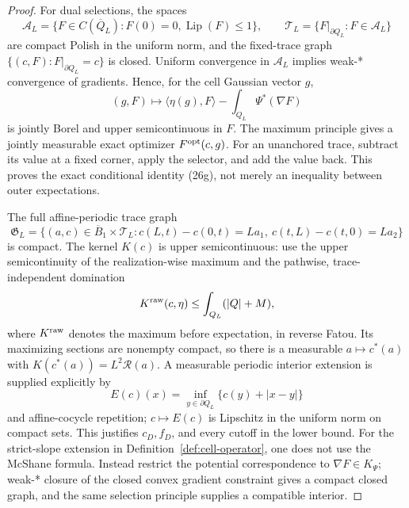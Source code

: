 \documentclass{smfart}
\theoremstyle{definition}
\newcommand{\1}{\mathbf 1}
\begin{document}
\begin{proof}
For dual selections, the spaces
\begin{equation*}
\mathscr A_ L=\{F\in C(\overline Q_ L):F(0)=0,
\operatorname {Lip}(F)\leq1\},
\qquad \mathcal T_ L=\{F|_ {\partial Q_ L}:F\in\mathscr A_ L\}
\end{equation*}
are compact Polish in the uniform norm, and the fixed-trace graph
$\{(c,F):F|_ {\partial Q_ L}=c\}$ is closed.  Uniform convergence in
$\mathscr A_ L$ implies weak-* convergence of gradients.  Hence, for
the cell Gaussian vector $g$,
\begin{equation}
(g,F)\longmapsto\langle\eta(g),F\rangle
-\int_ {Q_ L}\Psi^*(\nabla F)
\tag{26q}
\end{equation}
is jointly Borel and upper semicontinuous in $F$.  The maximum
principle gives a jointly measurable exact optimizer
$F^{\rm opt}(c,g)$.  For an unanchored trace, subtract its value at a
fixed corner, apply the selector, and add the value back.  This proves
the exact conditional identity (26g), not merely an inequality between
outer expectations.

The full affine-periodic trace graph
\begin{equation}
\mathfrak G_ L=\{(a,c)\in\overline B_ 1\times\mathcal T_ L:
c(L,t)-c(0,t)=La_ 1,\ c(t,L)-c(t,0)=La_ 2\}
\tag{26r}
\end{equation}
is compact.  The kernel $K(c)$ is upper semicontinuous: use the
upper semicontinuity of the realization-wise maximum and the pathwise,
trace-independent domination
\begin{equation*}
K^{\rm raw}(c,\eta)\leq\int_ {Q_ L}(|Q|+M),
\end{equation*}
where
$K^{\rm raw}$ denotes the maximum before expectation, in reverse
Fatou.  Its maximizing sections are
nonempty compact, so there is a measurable
$a\mapsto c^*(a)$ with $K(c^*(a))=L^2\mathcal R(a)$.  A measurable periodic
interior extension is supplied explicitly by
\begin{equation*}
E(c)(x)=\inf_ {y\in\partial Q_ L}\{c(y)+|x-y|\}
\end{equation*}
and affine-cocycle repetition; $c\mapsto E(c)$ is Lipschitz in the
uniform norm on compact sets.  This justifies $c_ D,f_ D$, and every
cutoff in the lower bound.  For the strict-slope extension in Definition~\ref{def:cell-operator}, one does not use the McShane formula.  Instead restrict
the potential correspondence to $\nabla F\in K_ \Psi$; weak-* closure
of the closed convex gradient constraint gives a compact closed graph,
and the same selection principle supplies a compatible interior.


\end{proof}
\end{document}
